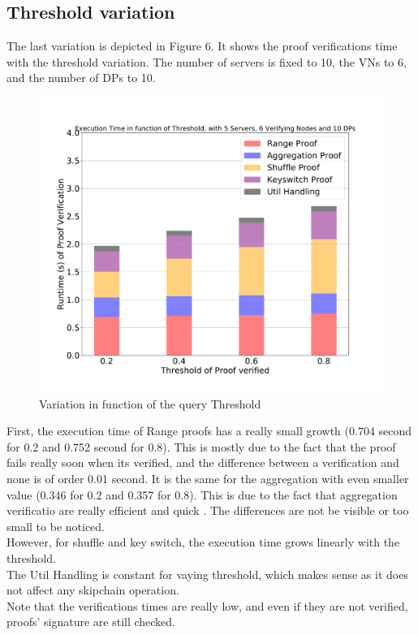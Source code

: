 \documentclass{article}
\begin{document}
\subsection{Threshold variation}
The last variation is depicted in Figure 6. It shows the proof verifications time with the threshold variation. The number of servers is fixed to 10, the VNs to 6, and the number of DPs to 10.\\

\begin{figure}[H]
\includegraphics[scale=0.5]{variationWithThreshold}
\caption{Variation in function of the query Threshold}
\end{figure}

First, the execution time of Range proofs has a really small growth (0.704 second for 0.2 and 0.752 second for 0.8). This is mostly due to the fact that the proof fails really soon when its verified, and the difference between a verification and none is of order 0.01 second. It is the same for the aggregation with even smaller value (0.346 for 0.2 and 0.357 for 0.8). This is due to the fact that aggregation verificatio are really efficient and quick . The differences are not be visible or too small to be noticed.\\
However, for shuffle and key switch, the execution time grows linearly with the threshold.\\
The Util Handling is constant for vaying threshold, which makes sense as it does not affect any skipchain operation.\\
Note that the verifications times are really low, and even if they are not verified, proofs' signature are still checked.
\end{document}
